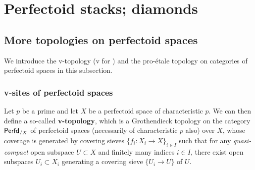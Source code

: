     \section{Perfectoid stacks; diamonds}
        \subsection{More topologies on perfectoid spaces}
            We introduce the v-topology (v for ) and the pro-\'etale topology on categories of perfectoid spaces in this subsection.
        
            \subsubsection{v-sites of perfectoid spaces}
                \begin{definition} \label{def: v_topology} 
                    Let $p$ be a prime and let $X$ be a perfectoid space of characteristic $p$. We can then define a so-called \textbf{v-topology}, which is a Grothendieck topology on the category $\mathsf{Perfd}_{/X}$ of perfectoid spaces (necessarily of characteristic $p$ also) over $X$, whose coverage is generated by covering sieves $\{f_i: X_i \to X\}_{i \in I}$ such that for any \textit{quasi-compact} open subspace $U \subset X$ and finitely many indices $i \in I$, there exist open subspaces $U_i \subset X_i$ generating a covering sieve $\{U_i \to U\}$ of $U$. 
                \end{definition}
